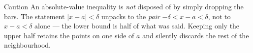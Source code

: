 \documentclass[a4paper,12pt,oneside]{memoir}
\begin{document}
\begin{envcaution}{Caution}{}{}
An absolute-value inequality is \emph{not} disposed of by simply dropping the bars. The statement \(|x - a| < \delta\) unpacks to the \emph{pair} \(-\delta < x - a < \delta\), not to \(x - a < \delta\) alone — the lower bound is half of what was said. Keeping only the upper half retains the points on one side of \(a\) and silently discards the rest of the neighbourhood.
\end{envcaution}
\end{document}
